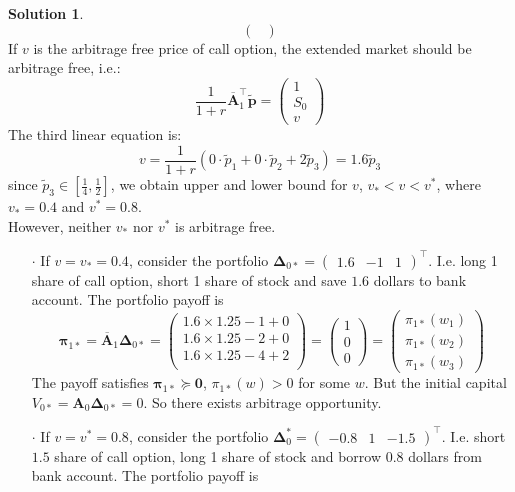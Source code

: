 \documentclass[a4paper, 10pt]{article}
\theoremstyle{definition}
\theoremstyle{hSol}
\newtheorem*{solution}{Solution}
\begin{document}
\begin{solution}
$$\begin{pmatrix}
\end{pmatrix}
$$
If $v$ is the arbitrage free price of call option, the extended market should be arbitrage free, i.e.:
\begin{equation}
	\frac{1}{1+r}\overline{\bm{A}}_1^{\top} \tilde{\bm{p}} = \begin{pmatrix}1 \\ S_0 \\ v\end{pmatrix}
\end{equation}
The third linear equation is:
$$
v = \frac{1}{1+r}(0\cdot\tilde{p}_1 + 0\cdot\tilde{p}_2 + 2 \tilde{p}_3) = 1.6 \tilde{p}_3
$$
since $\tilde{p}_3 \in [\frac{1}{4}, \frac{1}{2}]$, we obtain upper and lower bound for $v$, $v_* < v < v^*$, where $v_*=0.4$ and $v^* = 0.8$. \\
However, neither $v_*$ nor $v^*$ is arbitrage free.\\
\begin{itemize}
	\item[$\cdot$] If $v=v_* = 0.4$, consider the portfolio $\bm{\Delta}_{0*} = \begin{pmatrix}
		1.6 & -1 & 1
	\end{pmatrix}^{\top}$. I.e. long 1 share of call option, short 1 share of stock and save $1.6$ dollars to bank account. The portfolio payoff is
	$$
	\bm{\pi}_{1*} = \overline{\bm{A}}_1 \bm{\Delta}_{0*} = \begin{pmatrix}
		1.6 \times 1.25 - 1 + 0\\
		1.6 \times 1.25 - 2 + 0\\
		1.6 \times 1.25 - 4 + 2\\
	\end{pmatrix} = \begin{pmatrix}
		1 \\
		0 \\
		0
	\end{pmatrix} = \begin{pmatrix}
		\pi_{1*}(w_1) \\
		\pi_{1*}(w_2) \\
		\pi_{1*}(w_3)
	\end{pmatrix}
	$$
	The payoff satisfies $\bm{\pi}_{1*}\succeq \bm{0}$, $\pi_{1*}(w) > 0$ for some $w$. But the initial capital $V_{0*} = \bm{A}_0 \bm{\Delta}_{0*} = 0$. So there exists arbitrage opportunity.
	\item[$\cdot$] If $v=v^* = 0.8$, consider the portfolio $\bm{\Delta}_{0}^* = \begin{pmatrix}
		-0.8 & 1 & -1.5
	\end{pmatrix}^{\top}$. I.e. short $1.5$ share of call option, long 1 share of stock and borrow $0.8$ dollars from bank account. The portfolio payoff is

\end{itemize}
\end{solution}
\end{document}
